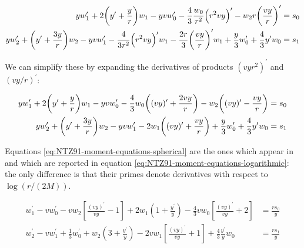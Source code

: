 \documentclass[main.tex]{subfiles}
\begin{document}
\begin{subequations}
\begin{align}
  y w_1^{\prime} + 2 \qty(y^{\prime} + \frac{y}{r}) w_1
  -yv w_0^{\prime}
  - \frac{4}{3} \frac{w_0}{r^2} \qty(r^2 v y)^{\prime}
  - w_2 r \qty(\frac{vy}{r})^{\prime} &= s_0  \\
  y w_2^{\prime} + \qty(y^{\prime} + \frac{3y}{r})w_2
  - yv w_1 ^{\prime} - \frac{4}{3r^2} \qty(r^2 vy)^{\prime} w_1
  - \frac{2r}{3} \qty(\frac{vy}{r})^{\prime} w_1
  + \frac{y}{3} w_0^{\prime} + \frac{4}{3} y^{\prime} w_0
  &= s_1
\end{align}
\end{subequations}

We can simplify these by expanding the derivatives of products \((vyr^2)^{\prime}\) and \((vy/r)^{\prime}\):

\begin{subequations} \label{eq:NTZ91-moment-equations-spherical}
\begin{align}
  y w_1^{\prime} + 2 \qty(y^{\prime} + \frac{y}{r}) w_1
  -yv w_0^{\prime}
  - \frac{4}{3} w_0 \qty((v y)^{\prime} + \frac{2vy}{r})
  - w_2 \qty((vy)^{\prime} - \frac{vy}{r}) &= s_0  \\
  y w_2^{\prime} + \qty(y^{\prime} + \frac{3y}{r})w_2
  - yv w_1 ^{\prime}
  - 2 w_1 \qty((vy)' + \frac{vy}{r})
  + \frac{y}{3} w_0^{\prime} + \frac{4}{3} y^{\prime} w_0
  &= s_1
\end{align}
\end{subequations}

Equations \eqref{eq:NTZ91-moment-equations-spherical} are the ones which appear in  \textcite[eq. 4]{NobiliTurollaZampieri:1991dec} and which are reported in equation \eqref{eq:NTZ91-moment-equations-logarithmic}: the only difference is that their primes denote derivatives with respect to \(\log (r / (2M))\).

\begin{subequations} \label{eq:NTZ91-moment-equations-logarithmic}
    \begin{align}
        w_{1}^{\prime}-v w_{0}^{\prime}
        -v w_{2}\left[\frac{(v y)^{\prime}}{v y}-1\right]
        +2 w_{1}\left(1+\frac{y^{\prime}}{y}\right)
        -\frac{4}{3} v w_{0}\left[\frac{(v y)^{\prime}}{v y}+2\right]&=\frac{r s_{0}}{y} \\
        w_{2}^{\prime}-v w_{1}^{\prime}+\frac{1}{3} w_{0}^{\prime} +w_{2}\left(3+\frac{y^{\prime}}{y}\right)-2 v w_{1}\left[\frac{(v y)^{\prime}}{v y}+1\right]+\frac{4}{3} \frac{y^{\prime}}{y} w_{0} &=\frac{r s_{1}}{y}
    \end{align}
\end{subequations}
\end{document}
